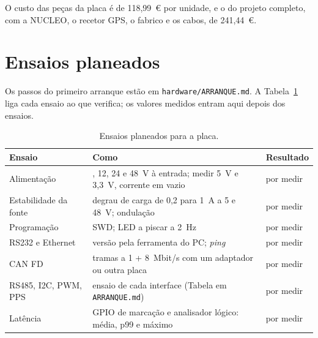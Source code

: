 O custo das peças da placa é de 118,99~€ por unidade, e o do projeto
completo, com a NUCLEO, o recetor GPS, o fabrico e os cabos, de 241,44~€.

\section{Ensaios planeados}

Os passos do primeiro arranque estão em \texttt{hardware/ARRANQUE.md}. A
Tabela~\ref{tab:res-ensaios} liga cada ensaio ao que verifica; os valores
medidos entram aqui depois dos ensaios.

\begin{table}[htbp]
\centering\small{}
\renewcommand{\arraystretch}{1.15}
\caption{Ensaios planeados para a placa.}
\label{tab:res-ensaios}
\begin{tabularx}{\textwidth}{@{}>{\raggedright\arraybackslash}p{}>{\raggedright\arraybackslash}X>{\raggedright\arraybackslash}p{}@{}}
\toprule
\rowcolor{LasetTint}
Ensaio & Como & Resultado \\
\midrule
Alimentação & 5, 12, 24 e 48~V à entrada; medir 5~V e 3,3~V, corrente em vazio & por medir \\
Estabilidade da fonte & degrau de carga de 0,2 para 1~A a 5 e 48~V; ondulação & por medir \\
Programação & SWD; LED a piscar a 2~Hz & por medir \\
RS232 e Ethernet & versão pela ferramenta do PC; \textit{ping} & por medir \\
CAN FD & tramas a 1 + 8~Mbit/s com um adaptador ou outra placa & por medir \\
RS485, I2C, PWM, PPS & ensaio de cada interface (Tabela em \texttt{ARRANQUE.md}) & por medir \\
Latência & GPIO de marcação e analisador lógico: média, p99 e máximo & por medir \\
\bottomrule
\end{tabularx}
\end{table}
